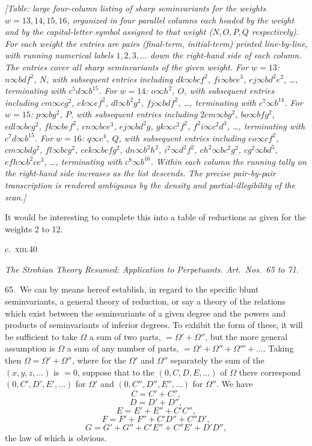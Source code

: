 \documentclass[11pt]{article}
\begin{document}
\clearpage
\textit{[Table: large four-column listing of sharp seminvariants for the weights $w = 13, 14, 15, 16$, organized in four parallel columns each headed by the weight and by the capital-letter symbol assigned to that weight ($N, O, P, Q$ respectively). For each weight the entries are pairs (final-term, initial-term) printed line-by-line, with running numerical labels $1, 2, 3, \ldots$ down the right-hand side of each column. The entries cover all sharp seminvariants of the given weight. For $w=13$: $n \infty bdf^2$, $N$, with subsequent entries including $dk \infty bcf^2$, $fi \infty bce^3$, $ej \infty bd^2e^2$, \ldots, terminating with $c^5d \infty b^{15}$. For $w=14$: $o \infty h^2$, $O$, with subsequent entries including $cm \infty cg^2$, $ek \infty ef^2$, $dl \infty b^2g^2$, $fj \infty bdf^2$, \ldots, terminating with $c^7 \infty b^{14}$. For $w=15$: $p \infty bg^2$, $P$, with subsequent entries including $2cm \infty bg^2$, $bo \infty bfg^2$, $edl \infty bcg^2$, $fk \infty bef^2$, $cn \infty bce^3$, $ej \infty bd^2g$, $gk \infty c^2f^2$, $f^2i \infty c^2d^3$, \ldots, terminating with $c^7d \infty b^{15}$. For $w=16$: $q \infty c^4$, $Q$, with subsequent entries including $eo \infty cf^2$, $cm \infty bdg^2$, $fl \infty bcg^2$, $cek \infty bcfg^2$, $dn \infty b^2h^2$, $i^2 \infty d^2f^2$, $ch^2 \infty bc^2g^2$, $cg^2 \infty bd^5$, $efh \infty b^2ce^3$, \ldots, terminating with $c^8 \infty b^{16}$. Within each column the running tally on the right-hand side increases as the list descends. The precise pair-by-pair transcription is rendered ambiguous by the density and partial-illegibility of the scan.]}

\medskip
It would be interesting to complete this into a table of reductions as given for the weights 2 to 12.

\medskip
\centerline{c.\ \textsc{xiii}.\hfill 40}

\clearpage
\begin{center}
\textit{The Strohian Theory Resumed: Application to Perpetuants. Art.\ Nos.\ 65 to 71.}
\end{center}

65.\ We can by means hereof establish, in regard to the specific blunt seminvariants, a general theory of reduction, or say a theory of the relations which exist between the seminvariants of a given degree and the powers and products of seminvariants of inferior degrees. To exhibit the form of these, it will be sufficient to take $\Omega$ a sum of two parts, $= \Omega' + \Omega''$, but the more general assumption is $\Omega$ a sum of any number of parts, $= \Omega' + \Omega'' + \Omega''' + \ldots$. Taking then $\Omega = \Omega' + \Omega''$, where for the $\Omega'$ and $\Omega''$ separately the sum of the $(x, y, z, \ldots)$ is $= 0$, suppose that to the $(0, C, D, E, \ldots)$ of $\Omega$ there correspond $(0, C', D', E', \ldots)$ for $\Omega'$ and $(0, C'', D'', E'', \ldots)$ for $\Omega''$. We have
\[
C = C' + C'',
\]
\[
D = D' + D'',
\]
\[
E = E' + E'' + C'C'',
\]
\[
F = F' + F'' + C'D'' + C''D',
\]
\[
G = G' + G'' + C'E'' + C''E' + D'D'',
\]
the law of which is obvious.
\end{document}
